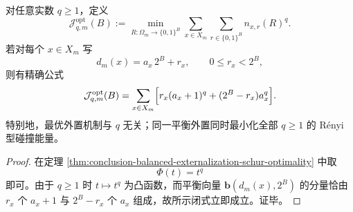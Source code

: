 \begin{corollary}\label{cor:conclusion-balanced-externalization-optimal-renyi-energy}
对任意实数 \(q\ge 1\)，定义
\[
\mathcal J_{q,m}^{\mathrm{opt}}(B)
:=
\min_{R:\Omega_m\to\{0,1\}^B}
\sum_{x\in X_m}\sum_{r\in\{0,1\}^B} n_{x,r}(R)^q.
\]
若对每个 \(x\in X_m\) 写
\[
d_m(x)=a_x\,2^B+r_x,\qquad 0\le r_x<2^B,
\]
则有精确公式
\[
\mathcal J_{q,m}^{\mathrm{opt}}(B)
=
\sum_{x\in X_m}
\Bigl[
r_x(a_x+1)^q+(2^B-r_x)a_x^q
\Bigr].
\]
特别地，最优外置机制与 \(q\) 无关；同一平衡外置同时最小化全部 \(q\ge 1\) 的 Rényi 型碰撞能量。
\end{corollary}
\begin{proof}
在定理 \ref{thm:conclusion-balanced-externalization-schur-optimality} 中取
\[
\Phi(t)=t^q
\]
即可。由于 \(q\ge 1\) 时 \(t\mapsto t^q\) 为凸函数，而平衡向量 \(\mathbf b(d_m(x),2^B)\) 的分量恰由 \(r_x\) 个 \(a_x+1\) 与 \(2^B-r_x\) 个 \(a_x\) 组成，故所示闭式立即成立。证毕。
\end{proof}

